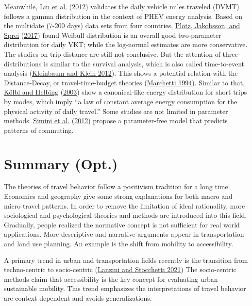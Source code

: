 \documentclass[
  11pt,
  openany]{memoir}
\begin{document}
Meanwhile, \protect\hyperlink{ref-linEstimationEnergyUse2012}{Lin et al.} (\protect\hyperlink{ref-linEstimationEnergyUse2012}{2012}) validates the daily vehicle miles traveled (DVMT) follows a gamma distribution in the context of PHEV energy analysis. Based on the multidate (7-200 days) data sets from four countries, \protect\hyperlink{ref-plotzDistributionIndividualDaily2017}{Plötz, Jakobsson, and Sprei} (\protect\hyperlink{ref-plotzDistributionIndividualDaily2017}{2017}) found Weibull distribution is an overall good two-parameter distribution for daily VKT; while the log-normal estimates are more conservative. The studies on trip distance are still not conclusive. But the attention of three distributions is similar to the survival analysis, which is also called time-to-event analysis (\protect\hyperlink{ref-kleinbaumSurvivalAnalysisSelfLearning2012}{Kleinbaum and Klein 2012}). This shows a potential relation with the Distance-Decay, or travel-time-budget theories (\protect\hyperlink{ref-marchettiAnthropologicalInvariantsTravel1994}{Marchetti 1994}). Similar to that, \protect\hyperlink{ref-kolblEnergyLawsHuman2003}{Kölbl and Helbing} (\protect\hyperlink{ref-kolblEnergyLawsHuman2003}{2003}) show a canonical-like energy distribution for short trips by modes, which imply ``a law of constant average energy consumption for the physical activity of daily travel.'' Some studies are not limited in parameter methods. \protect\hyperlink{ref-siminiUniversalModelMobility2012}{Simini et al.} (\protect\hyperlink{ref-siminiUniversalModelMobility2012}{2012}) propose a parameter-free model that predicts patterns of commuting.

\hypertarget{summary-opt.}{%
\section{Summary (Opt.)}\label{summary-opt.}}

The theories of travel behavior follow a positivism tradition for a long time. Economics and geography give some strong explanations for both macro and micro travel patterns. In order to remove the limitation of ideal rationality, more sociological and psychological theories and methods are introduced into this field. Gradually, people realized the normative concept is not sufficient for real world applications. More descriptive and narrative arguments appear in transportation and land use planning. An example is the shift from mobility to accessibility.

A primary trend in urban and transportation fields recently is the transition from techno-centric to socio-centric (\protect\hyperlink{ref-lanziniTechnocentrismSociocentrismEvolution2021}{Lanzini and Stocchetti 2021}) The socio-centric methods claim that accessibility is the key concept for evaluating urban sustainable mobility. This trend emphasizes the interpretations of travel behavior are context dependent and avoids generalizations.
\end{document}
